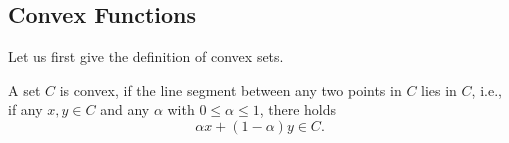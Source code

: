 \subsection{Convex Functions}
Let us first give the definition of convex sets.
\begin{definition}
	A set $C$ is convex, if the line segment between any two points in $C$ lies in $C$, i.e., if any $x, y\in C$ and any $\alpha$ with $0\leq \alpha \leq 1$, there holds
	\begin{equation}
	\alpha x+ (1- \alpha)y \in C.
	\end{equation}
\end{definition}
 


